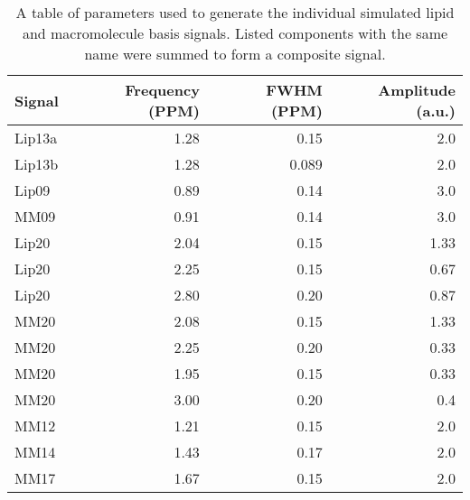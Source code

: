 \documentclass[num-refs]{wiley-article}
\begin{document}
\begin{table}[ht]
\begin{center}
\begin{tabular}{l r r r}
  \hline
  Signal & Frequency (PPM) & FWHM (PPM) & Amplitude (a.u.) \\
  \hline
  Lip13a & 1.28 & 0.15 & 2.0 \\
  Lip13b & 1.28 & 0.089 & 2.0 \\
  Lip09 & 0.89 & 0.14 & 3.0 \\
  MM09 & 0.91 & 0.14 & 3.0 \\
  Lip20 & 2.04 & 0.15 & 1.33 \\
  Lip20 & 2.25 & 0.15 & 0.67 \\
  Lip20 & 2.80 & 0.20 & 0.87 \\
  MM20 & 2.08 & 0.15 & 1.33 \\
  MM20 & 2.25 & 0.20 & 0.33 \\
  MM20 & 1.95 & 0.15 & 0.33 \\
  MM20 & 3.00 & 0.20 & 0.4 \\
  MM12 & 1.21 & 0.15 & 2.0 \\
  MM14 & 1.43 & 0.17 & 2.0 \\
  MM17 & 1.67 & 0.15 & 2.0 \\
  \hline
\end{tabular}
\end{center}
\caption{A table of parameters used to generate the individual simulated lipid and macromolecule basis signals. Listed components with the same name were summed to form a composite signal.}
\label{lip_mm_tab}
\end{table}
\end{document}
